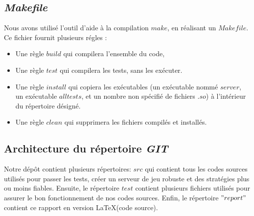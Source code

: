 \documentclass{article}
\begin{document}
    \subsection{\textit{Makefile}}
Nous avons utilisé l'outil d'aide à la compilation \textbf{$make$}, en réalisant un \textbf{$Makefile$}.
Ce fichier fournit plusieurs régles :
\begin{itemize}
    \item Une règle $build$ qui compilera l'ensemble du code,
    \item Une règle $test$ qui compilera les tests, sans les exécuter.
    \item Une règle $install$ qui copiera les exécutables (un exécutable nommé $server$, un exécutable $alltests$, et un nombre non spécifié de fichiers $.so$) à l'intérieur du répertoire désigné.
    \item Une règle $clean$ qui supprimera les fichiers compilés et installés.
\end{itemize}

    \subsection{Architecture du répertoire \textit{GIT}}
    Notre dépôt contient plusieurs répertoires: $src$ qui contient tous les codes sources utilisés pour passer les tests, créer un serveur de jeu robuste et des stratégies plus ou moins fiables.
    Ensuite, le répertoire $test$ contient plusieurs fichiers utilisés pour assurer le bon fonctionnement de nos codes sources. Enfin, le répertoire $"report"$ contient ce rapport en version \LaTeX (code source).

\newpage
\end{document}
